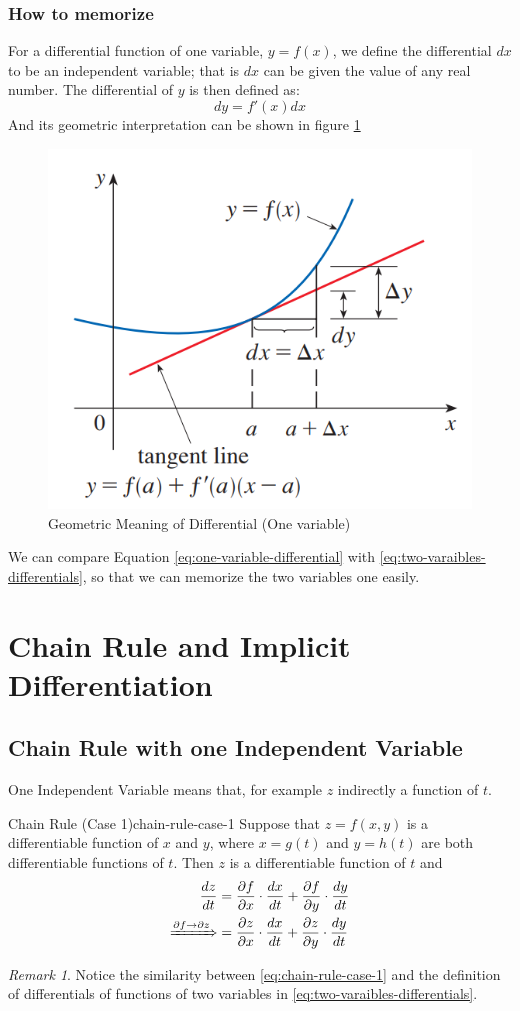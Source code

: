 \documentclass[math,code]{amznotes}
\theoremstyle{remark}
\newtheorem*{remark}{Remark}
\begin{document}
\subsubsection{How to memorize}
For a differential function of one variable, $y=f(x)$, we define the differential $dx$ to be an independent variable; that is $dx$ can be given the value of any real number. The differential of $y$ is then defined as:
\begin{equation} \label{eq:one-variable-differential}
    dy = f'(x)dx
\end{equation}
And its geometric interpretation can be shown in figure \ref{fig:geometric-meaning-of-differential-one-variable}
\begin{figure}[H]
    \centering
    \includegraphics[width=0.4\linewidth]{images/geometric-meaning-of-differential-one-variable.png}
    \caption{Geometric Meaning of Differential (One variable)}
    \label{fig:geometric-meaning-of-differential-one-variable}
\end{figure}
We can compare Equation \eqref{eq:one-variable-differential} with \eqref{eq:two-varaibles-differentials}, so that we can memorize the two variables one easily.
\section{Chain Rule and Implicit Differentiation}
\subsection{Chain Rule with one Independent Variable}
One Independent Variable means that, for example $z$ indirectly a function of $t$.
\begin{thmbox}{Chain Rule (Case 1)}{chain-rule-case-1}
    Suppose that $z=f(x,y)$ is a differentiable function of $x$ and $y$, where $x=g(t)$ and $y=h(t)$ are both differentiable functions of $t$. Then $z$ is a differentiable function of $t$ and
    \begin{align} 
        \frac{dz}{dt}&=\frac{\partial f}{\partial x}\cdot \frac{dx}{dt}+\frac{\partial f}{\partial y}\cdot \frac{dy}{dt} \label{eq:chain-rule-case-1} \\ 
        \xRightarrow{\partial f \to \partial z} &= \frac{\partial z}{\partial x}\cdot\frac{dx}{dt} +\frac{\partial z}{\partial y}\cdot \frac{dy}{dt}
    \end{align}
\end{thmbox}
\begin{notebox}
    \begin{remark}
        Notice the similarity between \eqref{eq:chain-rule-case-1} and the definition of differentials of functions of two variables in \eqref{eq:two-varaibles-differentials}.
    \end{remark}
\end{notebox}
\end{document}
